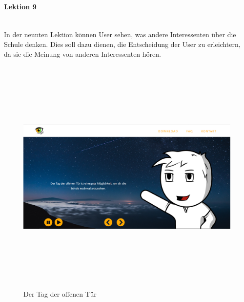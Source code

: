 \paragraph{Lektion 9} \leavevmode \\
In der neunten Lektion können User sehen, was andere Interessenten über die Schule denken. Dies soll dazu dienen, die Entscheidung der User zu erleichtern, da sie die Meinung von anderen Interessenten hören.
\begin{figure}[h]
	\centering
\includegraphics[width=12cm,height=12cm,keepaspectratio]{webseite_abb20} 
	\caption{Der Tag der offenen Tür}
\end{figure}
